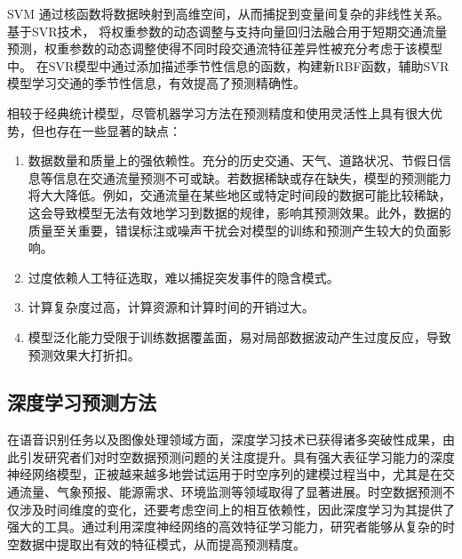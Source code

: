 SVM 通过核函数将数据映射到高维空间，从而捕捉到变量间复杂的非线性关系。基于SVR技术，\textcite{2013_Jeong_Supervised_Weighting_Online_Learning_Algorithm_for_Short_Term_Traffic_Flow_Prediction} 将权重参数的动态调整与支持向量回归法融合用于短期交通流量预测，权重参数的动态调整使得不同时段交通流特征差异性被充分考虑于该模型中。\textcite{2013_Lippi_Short_term_traffic_flow_forecasting_An_experimental_comparison_of_time_series_analysis_and_supervised_learning} 在SVR模型中通过添加描述季节性信息的函数，构建新RBF函数，辅助SVR模型学习交通的季节性信息，有效提高了预测精确性。

相较于经典统计模型，尽管机器学习方法在预测精度和使用灵活性上具有很大优势，但也存在一些显著的缺点：
\begin{enumerate}[(1)]
  \item 数据数量和质量上的强依赖性。充分的历史交通、天气、道路状况、节假日信息等信息在交通流量预测不可或缺。若数据稀缺或存在缺失，模型的预测能力将大大降低。例如，交通流量在某些地区或特定时间段的数据可能比较稀缺，这会导致模型无法有效地学习到数据的规律，影响其预测效果。此外，数据的质量至关重要，错误标注或噪声干扰会对模型的训练和预测产生较大的负面影响。
  \item 过度依赖人工特征选取，难以捕捉突发事件的隐含模式。
  \item 计算复杂度过高，计算资源和计算时间的开销过大。
  \item 模型泛化能力受限于训练数据覆盖面，易对局部数据波动产生过度反应，导致预测效果大打折扣。
\end{enumerate}


\subsection{深度学习预测方法}
在语音识别任务以及图像处理领域方面，深度学习技术已获得诸多突破性成果，由此引发研究者们对时空数据预测问题的关注度提升。具有强大表征学习能力的深度神经网络模型，正被越来越多地尝试运用于时空序列的建模过程当中，尤其是在交通流量、气象预报、能源需求、环境监测等领域取得了显著进展。时空数据预测不仅涉及时间维度的变化，还要考虑空间上的相互依赖性，因此深度学习为其提供了强大的工具。通过利用深度神经网络的高效特征学习能力，研究者能够从复杂的时空数据中提取出有效的特征模式，从而提高预测精度。

